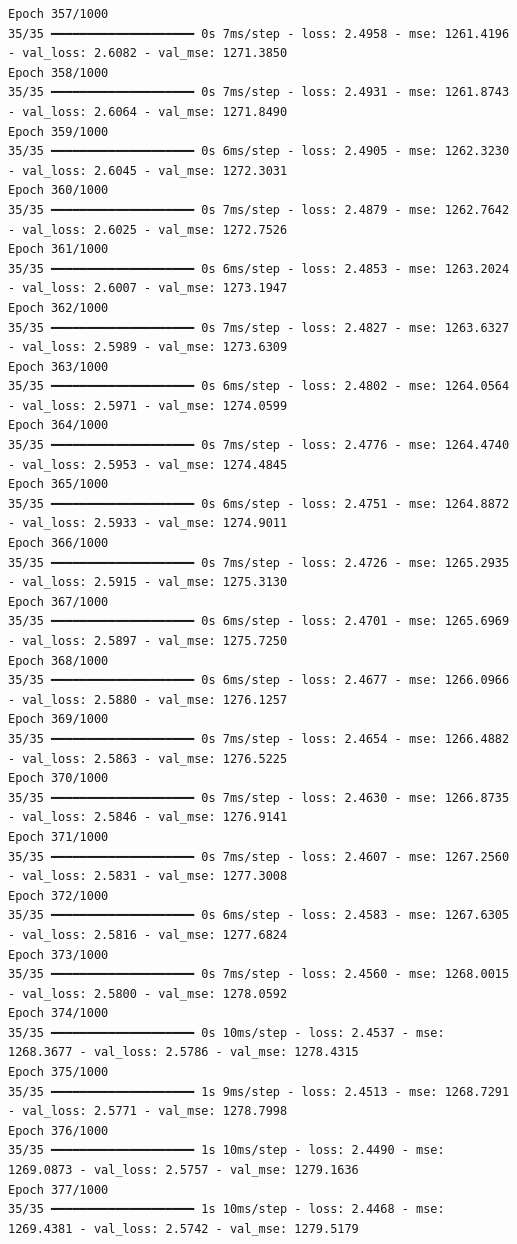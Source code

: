 \documentclass[
  letterpaper,
  DIV=11,
  numbers=noendperiod]{scrreprt}
\begin{document}
\begin{verbatim}
Epoch 357/1000
35/35 ━━━━━━━━━━━━━━━━━━━━ 0s 7ms/step - loss: 2.4958 - mse: 1261.4196 - val_loss: 2.6082 - val_mse: 1271.3850
Epoch 358/1000
35/35 ━━━━━━━━━━━━━━━━━━━━ 0s 7ms/step - loss: 2.4931 - mse: 1261.8743 - val_loss: 2.6064 - val_mse: 1271.8490
Epoch 359/1000
35/35 ━━━━━━━━━━━━━━━━━━━━ 0s 6ms/step - loss: 2.4905 - mse: 1262.3230 - val_loss: 2.6045 - val_mse: 1272.3031
Epoch 360/1000
35/35 ━━━━━━━━━━━━━━━━━━━━ 0s 7ms/step - loss: 2.4879 - mse: 1262.7642 - val_loss: 2.6025 - val_mse: 1272.7526
Epoch 361/1000
35/35 ━━━━━━━━━━━━━━━━━━━━ 0s 6ms/step - loss: 2.4853 - mse: 1263.2024 - val_loss: 2.6007 - val_mse: 1273.1947
Epoch 362/1000
35/35 ━━━━━━━━━━━━━━━━━━━━ 0s 7ms/step - loss: 2.4827 - mse: 1263.6327 - val_loss: 2.5989 - val_mse: 1273.6309
Epoch 363/1000
35/35 ━━━━━━━━━━━━━━━━━━━━ 0s 6ms/step - loss: 2.4802 - mse: 1264.0564 - val_loss: 2.5971 - val_mse: 1274.0599
Epoch 364/1000
35/35 ━━━━━━━━━━━━━━━━━━━━ 0s 7ms/step - loss: 2.4776 - mse: 1264.4740 - val_loss: 2.5953 - val_mse: 1274.4845
Epoch 365/1000
35/35 ━━━━━━━━━━━━━━━━━━━━ 0s 6ms/step - loss: 2.4751 - mse: 1264.8872 - val_loss: 2.5933 - val_mse: 1274.9011
Epoch 366/1000
35/35 ━━━━━━━━━━━━━━━━━━━━ 0s 7ms/step - loss: 2.4726 - mse: 1265.2935 - val_loss: 2.5915 - val_mse: 1275.3130
Epoch 367/1000
35/35 ━━━━━━━━━━━━━━━━━━━━ 0s 6ms/step - loss: 2.4701 - mse: 1265.6969 - val_loss: 2.5897 - val_mse: 1275.7250
Epoch 368/1000
35/35 ━━━━━━━━━━━━━━━━━━━━ 0s 6ms/step - loss: 2.4677 - mse: 1266.0966 - val_loss: 2.5880 - val_mse: 1276.1257
Epoch 369/1000
35/35 ━━━━━━━━━━━━━━━━━━━━ 0s 7ms/step - loss: 2.4654 - mse: 1266.4882 - val_loss: 2.5863 - val_mse: 1276.5225
Epoch 370/1000
35/35 ━━━━━━━━━━━━━━━━━━━━ 0s 7ms/step - loss: 2.4630 - mse: 1266.8735 - val_loss: 2.5846 - val_mse: 1276.9141
Epoch 371/1000
35/35 ━━━━━━━━━━━━━━━━━━━━ 0s 7ms/step - loss: 2.4607 - mse: 1267.2560 - val_loss: 2.5831 - val_mse: 1277.3008
Epoch 372/1000
35/35 ━━━━━━━━━━━━━━━━━━━━ 0s 6ms/step - loss: 2.4583 - mse: 1267.6305 - val_loss: 2.5816 - val_mse: 1277.6824
Epoch 373/1000
35/35 ━━━━━━━━━━━━━━━━━━━━ 0s 7ms/step - loss: 2.4560 - mse: 1268.0015 - val_loss: 2.5800 - val_mse: 1278.0592
Epoch 374/1000
35/35 ━━━━━━━━━━━━━━━━━━━━ 0s 10ms/step - loss: 2.4537 - mse: 1268.3677 - val_loss: 2.5786 - val_mse: 1278.4315
Epoch 375/1000
35/35 ━━━━━━━━━━━━━━━━━━━━ 1s 9ms/step - loss: 2.4513 - mse: 1268.7291 - val_loss: 2.5771 - val_mse: 1278.7998
Epoch 376/1000
35/35 ━━━━━━━━━━━━━━━━━━━━ 1s 10ms/step - loss: 2.4490 - mse: 1269.0873 - val_loss: 2.5757 - val_mse: 1279.1636
Epoch 377/1000
35/35 ━━━━━━━━━━━━━━━━━━━━ 1s 10ms/step - loss: 2.4468 - mse: 1269.4381 - val_loss: 2.5742 - val_mse: 1279.5179

\end{verbatim}
\end{document}
